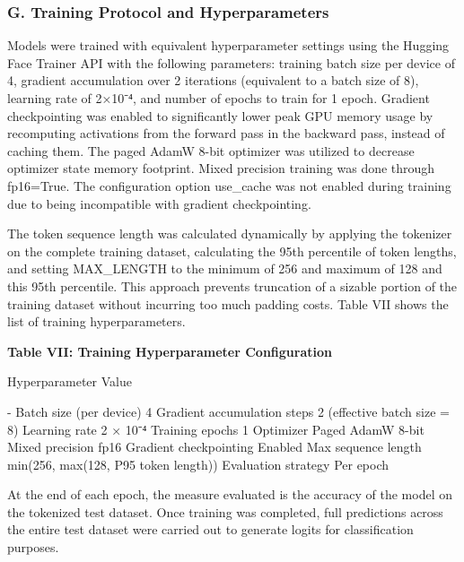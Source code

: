 \subsubsection{G. Training Protocol and
Hyperparameters}\label{g.-training-protocol-and-hyperparameters}

Models were trained with equivalent hyperparameter settings using the
Hugging Face Trainer API with the following parameters: training batch
size per device of 4, gradient accumulation over 2 iterations
(equivalent to a batch size of 8), learning rate of 2×10⁻⁴, and number
of epochs to train for 1 epoch. Gradient checkpointing was enabled to
significantly lower peak GPU memory usage by recomputing activations
from the forward pass in the backward pass, instead of caching them. The
paged AdamW 8-bit optimizer was utilized to decrease optimizer state
memory footprint. Mixed precision training was done through fp16=True.
The configuration option use\_cache was not enabled during training due
to being incompatible with gradient checkpointing.

The token sequence length was calculated dynamically by applying the
tokenizer on the complete training dataset, calculating the 95th
percentile of token lengths, and setting MAX\_LENGTH to the minimum of
256 and maximum of 128 and this 95th percentile. This approach prevents
truncation of a sizable portion of the training dataset without
incurring too much padding costs. Table VII shows the list of training
hyperparameters.

\textbf{Table VII: Training Hyperparameter Configuration}

Hyperparameter \textbar{} Value \textbar{}

\textbar\textbar-\textbar{} \textbar{} Batch size (per device)
\textbar{} 4 \textbar{} \textbar{} Gradient accumulation steps
\textbar{} 2 (effective batch size = 8) \textbar{} \textbar{} Learning
rate \textbar{} 2 × 10⁻⁴ \textbar{} \textbar{} Training epochs
\textbar{} 1 \textbar{} \textbar{} Optimizer \textbar{} Paged AdamW
8-bit \textbar{} \textbar{} Mixed precision \textbar{} fp16 \textbar{}
\textbar{} Gradient checkpointing \textbar{} Enabled \textbar{}
\textbar{} Max sequence length \textbar{} min(256, max(128, P95 token
length)) \textbar{} \textbar{} Evaluation strategy \textbar{} Per epoch
\textbar{}

At the end of each epoch, the measure evaluated is the accuracy of the
model on the tokenized test dataset. Once training was completed, full
predictions across the entire test dataset were carried out to generate
logits for classification purposes.

